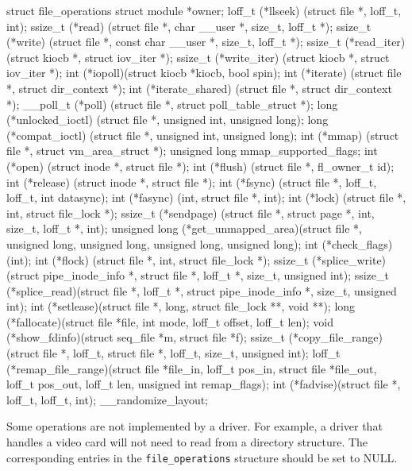 \documentclass[10pt, oneside]{book}
\begin{document}
\begin{code}
struct file_operations {
    struct module *owner;
    loff_t (*llseek) (struct file *, loff_t, int);
    ssize_t (*read) (struct file *, char __user *, size_t, loff_t *);
    ssize_t (*write) (struct file *, const char __user *, size_t, loff_t *);
    ssize_t (*read_iter) (struct kiocb *, struct iov_iter *);
    ssize_t (*write_iter) (struct kiocb *, struct iov_iter *);
    int (*iopoll)(struct kiocb *kiocb, bool spin);
    int (*iterate) (struct file *, struct dir_context *);
    int (*iterate_shared) (struct file *, struct dir_context *);
    __poll_t (*poll) (struct file *, struct poll_table_struct *);
    long (*unlocked_ioctl) (struct file *, unsigned int, unsigned long);
    long (*compat_ioctl) (struct file *, unsigned int, unsigned long);
    int (*mmap) (struct file *, struct vm_area_struct *);
    unsigned long mmap_supported_flags;
    int (*open) (struct inode *, struct file *);
    int (*flush) (struct file *, fl_owner_t id);
    int (*release) (struct inode *, struct file *);
    int (*fsync) (struct file *, loff_t, loff_t, int datasync);
    int (*fasync) (int, struct file *, int);
    int (*lock) (struct file *, int, struct file_lock *);
    ssize_t (*sendpage) (struct file *, struct page *, int, size_t, loff_t *, int);
    unsigned long (*get_unmapped_area)(struct file *, unsigned long, unsigned long, unsigned long, unsigned long);
    int (*check_flags)(int);
    int (*flock) (struct file *, int, struct file_lock *);
    ssize_t (*splice_write)(struct pipe_inode_info *, struct file *, loff_t *, size_t, unsigned int);
    ssize_t (*splice_read)(struct file *, loff_t *, struct pipe_inode_info *, size_t, unsigned int);
    int (*setlease)(struct file *, long, struct file_lock **, void **);
    long (*fallocate)(struct file *file, int mode, loff_t offset,
        loff_t len);
    void (*show_fdinfo)(struct seq_file *m, struct file *f);
    ssize_t (*copy_file_range)(struct file *, loff_t, struct file *,
        loff_t, size_t, unsigned int);
    loff_t (*remap_file_range)(struct file *file_in, loff_t pos_in,
             struct file *file_out, loff_t pos_out,
             loff_t len, unsigned int remap_flags);
    int (*fadvise)(struct file *, loff_t, loff_t, int);
} __randomize_layout;
\end{code}

Some operations are not implemented by a driver.
For example, a driver that handles a video card will not need to read from a directory structure.
The corresponding entries in the \verb|file_operations| structure should be set to NULL.
\end{document}
